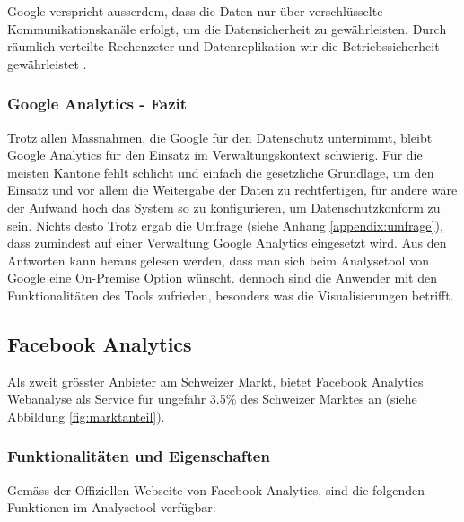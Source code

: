 Google verspricht ausserdem, dass die Daten nur über verschlüsselte Kommunikationskanäle erfolgt, um die Datensicherheit zu gewährleisten. Durch räumlich verteilte Rechenzeter und Datenreplikation wir die Betriebssicherheit gewährleistet \parencite{GoogleAnalyticsDatenschutz}.

\subsubsection{Google Analytics - Fazit}
Trotz allen Massnahmen, die Google für den Datenschutz unternimmt, bleibt Google Analytics für den Einsatz im Verwaltungskontext schwierig. Für die meisten Kantone fehlt schlicht und einfach die gesetzliche Grundlage, um den Einsatz und vor allem die Weitergabe der Daten zu rechtfertigen, für andere wäre der Aufwand hoch das System so zu konfigurieren, um Datenschutzkonform zu sein. Nichts desto Trotz ergab die Umfrage (siehe Anhang \ref{appendix:umfrage}), dass zumindest auf einer Verwaltung Google Analytics eingesetzt wird. Aus den Antworten kann heraus gelesen werden, dass man sich beim Analysetool von Google eine On-Premise Option wünscht. dennoch sind die Anwender mit den Funktionalitäten des Tools zufrieden, besonders was die Visualisierungen betrifft.

\subsection{Facebook Analytics}

Als zweit grösster Anbieter am Schweizer Markt, bietet Facebook Analytics Webanalyse als Service für ungefähr 3.5\% des Schweizer Marktes an (siehe Abbildung \ref{fig:marktanteil}).

\subsubsection{Funktionalitäten und Eigenschaften}
Gemäss der Offiziellen Webseite von Facebook Analytics, sind die folgenden Funktionen im Analysetool verfügbar:

